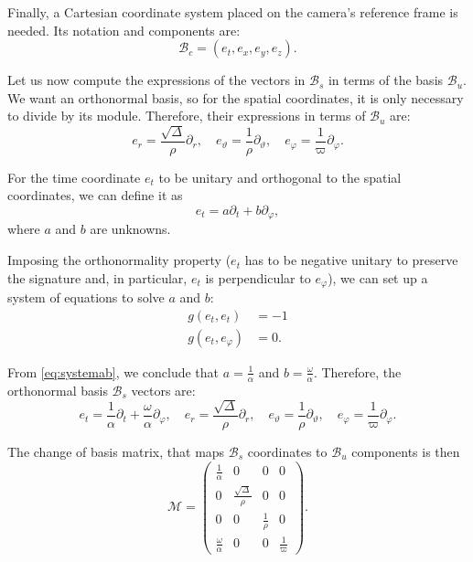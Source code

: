 Finally, a Cartesian coordinate system placed on the camera's reference frame is needed. Its notation and components are:
\[
	\mathcal{B}_c = (e_t, e_x, e_y, e_z).
\]

Let us now compute the expressions of the vectors in $\mathcal{B}_s$ in terms of the basis $\mathcal{B}_u$. We want an orthonormal basis, so for the spatial coordinates, it is only necessary to divide by its module. Therefore, their expressions in terms of $\mathcal{B}_u$ are:
\begin{equation}
	e_r = \frac{\sqrt{\Delta}}{\rho} \partial_r, \quad
	e_\vartheta = \frac{1}{\rho} \partial_\vartheta, \quad
	e_\varphi = \frac{1}{\varpi} \partial_\varphi.
\end{equation}

For the time coordinate $e_t$ to be unitary and orthogonal to the spatial coordinates, we can define it as
\[
	e_t = a\partial_t + b\partial_\varphi,
\]
where $a$ and $b$ are unknowns.

Imposing the orthonormality property ($e_t$ has to be negative unitary to preserve the signature and, in particular, $e_t$ is perpendicular to $e_\varphi$), we can set up a system of equations to solve $a$ and $b$:
\begin{align}
	\label{eq:systemab}
	g(e_t, e_t) &= -1 \\ \nonumber
	g(e_t, e_\varphi) &= 0.
\end{align}

From \autoref{eq:systemab}, we conclude that $a = \frac{1}{\alpha}$ and $b = \frac{\omega}{\alpha}$. Therefore, the orthonormal basis $\mathcal{B}_s$ vectors are:
\begin{equation}
	e_t = \frac{1}{\alpha}\partial_t + \frac{\omega}{\alpha}\partial_\varphi, \quad
	e_r = \frac{\sqrt{\Delta}}{\rho} \partial_r, \quad
	e_\vartheta = \frac{1}{\rho} \partial_\vartheta, \quad
	e_\varphi = \frac{1}{\varpi} \partial_\varphi.
\end{equation}

The change of basis matrix, that maps $\mathcal{B}_s$ coordinates to $\mathcal{B}_u$ components is then
\begin{equation}
	\mathcal{M} = \begin{pmatrix}
	\frac{1}{\alpha} & 0 & 0 & 0 \\
	0 & \frac{\sqrt{\Delta}}{\rho} & 0 & 0 \\
	0 & 0 & \frac{1}{\rho} & 0 \\
	\frac{\omega}{\alpha} & 0 & 0 & \frac{1}{\varpi}
	\end{pmatrix}.
\end{equation}

